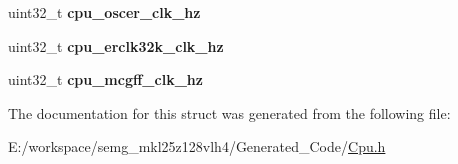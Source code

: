 \begin{DoxyCompactItemize}
\item 
\hypertarget{struct_t_cpu_clock_configuration_a8573f3896f85f97201ef2d6252d99905}{uint32\-\_\-t {\bfseries cpu\-\_\-oscer\-\_\-clk\-\_\-hz}}\label{struct_t_cpu_clock_configuration_a8573f3896f85f97201ef2d6252d99905}

\item 
\hypertarget{struct_t_cpu_clock_configuration_a3f68e3893f7dec551e938a909929687b}{uint32\-\_\-t {\bfseries cpu\-\_\-erclk32k\-\_\-clk\-\_\-hz}}\label{struct_t_cpu_clock_configuration_a3f68e3893f7dec551e938a909929687b}

\item 
\hypertarget{struct_t_cpu_clock_configuration_a5bd9b1235d0f85073ed01c126782d898}{uint32\-\_\-t {\bfseries cpu\-\_\-mcgff\-\_\-clk\-\_\-hz}}\label{struct_t_cpu_clock_configuration_a5bd9b1235d0f85073ed01c126782d898}

\end{DoxyCompactItemize}


The documentation for this struct was generated from the following file\-:\begin{DoxyCompactItemize}
\item 
E\-:/workspace/semg\-\_\-mkl25z128vlh4/\-Generated\-\_\-\-Code/\hyperlink{_cpu_8h}{Cpu.\-h}\end{DoxyCompactItemize}

